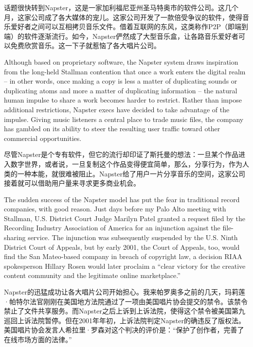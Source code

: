 \ifdefined\chs
话题很快转到Napster，这是一家加利福尼亚州圣马特奥市的软件公司。这几个月，这家公司成了各大媒体的宠儿。这家公司开发了一款倍受争议的软件，使得音乐爱好者之间可以互相拷贝音乐文件。借着互联网的东风，这类称作P2P（即端到端）的软件逐渐流行。如今，Napster俨然成了大型音乐盒，让各路音乐爱好者可以免费欣赏音乐。这一下子就惹恼了各大唱片公司。
\fi

\ifdefined\eng
Although based on proprietary software, the Napster system draws inspiration from the long-held Stallman contention that once a work enters the digital realm -- in other words, once making a copy is less a matter of duplicating sounds or duplicating atoms and more a matter of duplicating information -- the natural human impulse to share a work becomes harder to restrict. Rather than impose additional restrictions, Napster execs have decided to take advantage of the impulse. Giving music listeners a central place to trade music files, the company has gambled on its ability to steer the resulting user traffic toward other commercial opportunities.
\fi

\ifdefined\chs
尽管Napster是个专有软件，但它的流行却印证了斯托曼的想法：一旦某个作品进入数字世界，或者说，一旦复制这个作品变得便宜简单，那么，分享行为，作为人类的一种本能，就很难被阻止。Napster给了用户一片分享音乐的空间，这家公司接着就可以借助用户量来寻求更多商业机会。
\fi

\ifdefined\eng
The sudden success of the Napster model has put the fear in traditional record companies, with good reason. Just days before my Palo Alto meeting with Stallman, U.S. District Court Judge Marilyn Patel granted a request filed by the Recording Industry Association of America for an injunction against the file-sharing service. The injunction was subsequently suspended by the U.S. Ninth District Court of Appeals, but by early 2001, the Court of Appeals, too, would find the San Mateo-based company in breach of copyright law, a decision RIAA spokesperson Hillary Rosen would later proclaim a ``clear victory for the creative content community and the legitimate online marketplace.''
\fi

\ifdefined\chs
Napster的迅猛成功让各大唱片公司开始担心。我来帕罗奥多之前的几天，玛莉莲·帕特尔法官刚刚在美国地方法院通过了一项由美国唱片协会提交的禁令。该禁令禁止了文件共享服务。而Napster之后上诉到上诉法院，使得这个禁令被美国第九巡回上诉法院暂停。但在2001年年初，上诉法院判定Napster的确违反了版权法。美国唱片协会发言人希拉里·罗森对这个判决的评价是：``保护了创作者，完善了在线市场方面的法律。''
\fi


